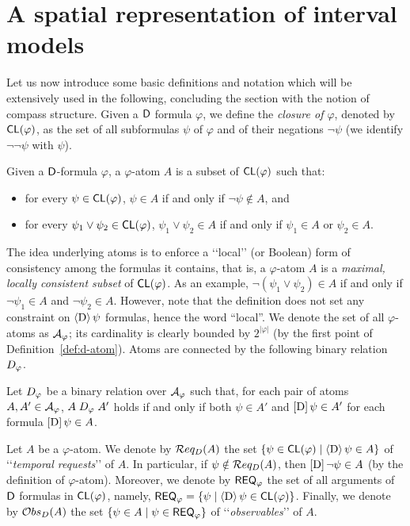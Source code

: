 \section{A spatial representation of interval models}\label{sec:compass}

Let us now introduce some basic definitions and notation which will be
extensively used in the following, concluding the section with the notion of compass structure. Given a $\mathsf{D}$ formula $\varphi$,
we define the \emph{closure of $\varphi$}, denoted by
$\mathsf{CL}(\varphi)$, as the set of all subformulas $\psi$ of $\varphi$ and of their
negations $\neg\psi$ (we identify $\neg\neg \psi$ with $\psi$). %

\begin{definition}\label{def:d-atom}
Given a $\mathsf{D}$-formula $\varphi$, a $\varphi$-atom $A$ is a subset of
$\mathsf{CL}(\varphi)$ such that: 
\begin{itemize}
    \item  for every $\psi \in \mathsf{CL}(\varphi)$, $\psi \in A$ if and only if $\neg\psi \notin A$, and
    \item for every $\psi_1 \vee \psi_2 \in \mathsf{CL}(\varphi)$, $\psi_1 \vee \psi_2 \in A$ if and only if $\psi_1 \in A$ or $\psi_2 \in A$.
\end{itemize}
\end{definition}

The idea underlying atoms is to enforce a \lq\lq local\rq\rq{} (or Boolean) form of consistency among the formulas it contains, that is, a $\varphi$-atom $A$ is a \emph{maximal, locally consistent subset} of $\mathsf{CL}(\varphi)$. As an example, $\neg(\psi_1 \vee \psi_2) \in A$ if and only if $\neg\psi_1\in A$ and $\neg\psi_2\in A$. However, note that the definition does not set any constraint on $\operatorname{\langle D\rangle}\psi$ formulas, hence the word ``local''.
We denote the set of all $\varphi$-atoms as $\mathcal{A}_\varphi$; its cardinality is clearly bounded by $2^{|\varphi|}$ (by the first point of Definition~\ref{def:d-atom}). Atoms are connected by the following binary relation $\mathrel{D_\varphi}$.

\begin{definition}\label{def:Dphi-relation}
Let $\mathrel{D_\varphi}$ be a binary relation over $\mathcal{A}_\varphi$ such that, for each pair of atoms $A, A' \in \mathcal{A}_\varphi$, $A \mathrel{D_\varphi} A'$ holds if and only if both $\psi \in A'$ and $\operatorname{\mathopen[ D \mathclose]}\psi \in A'$ for each formula $\operatorname{\mathopen[ D \mathclose]}\psi \in A$.
\end{definition}

Let $A$ be a $\varphi$-atom. We denote by $\mathcal{R} eq_D(A)$ the set $\{\psi \in \mathsf{CL}(\varphi) \mid \operatorname{\langle D\rangle} \psi \in A\}$ of \lq\lq \emph{temporal requests}\rq\rq{} of $A$. In particular, if $ \psi \notin \mathcal{R} eq_D(A)$, then $\operatorname{\mathopen[ D \mathclose]} \neg \psi \in A$ (by the definition of $\varphi$-atom). Moreover, we denote by $\mathsf{REQ}_{\varphi}$ the set of all  arguments of $\mathsf{D}$ formulas in $\mathsf{CL}(\varphi)$, namely, $\mathsf{REQ}_{\varphi}=\{ \psi \mid \operatorname{\langle D\rangle} \psi\in \mathsf{CL}(\varphi)\}$. Finally, we denote by $\mathcal{O} bs_D(A)$ the set $\{\psi \in A \mid \psi \in \mathsf{REQ}_{\varphi}\}$ of \lq\lq \emph{observables}\rq\rq{} of $A$. 

